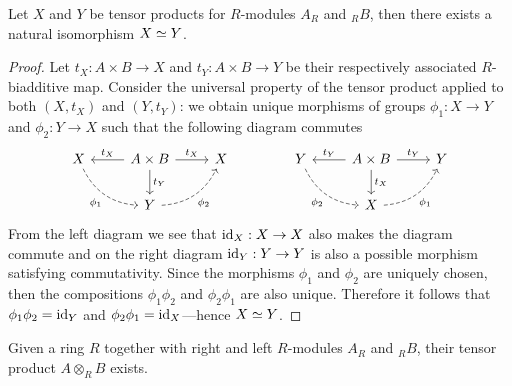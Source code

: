 \begin{lemma}
    \label{lem:tensor-product-unique-up-to-iso}
    Let \(X\) and \(Y\) be tensor products for \(R\)-modules \(A_R\) and \({}_RB\),
    then there exists a natural isomorphism \(X \simeq Y\).
\end{lemma}

\begin{proof}
    Let \(t_X: A \times B \to X\) and \(t_Y: A \times B \to Y\) be their
    respectively associated \(R\)-biadditive map. Consider the universal property of
    the tensor product applied to both \((X, t_X)\) and \((Y, t_Y)\): we obtain
    unique morphisms of groups \(\phi_1: X \to Y\) and \(\phi_2: Y \to X\) such that
    the following diagram commutes
    \[
        \begin{tikzcd}
            X \ar[rd, dashed, bend right, "\phi_1"']
            &A \times B \ar[l, "t_X"']
            \ar[d, "t_Y"]
            \ar[r, "t_X"]
            &X
            \\
            &Y \ar[ru, "\phi_2"', dashed, bend right] &
        \end{tikzcd}
        \qquad
        \qquad
        \begin{tikzcd}
            Y \ar[rd, dashed, bend right, "\phi_2"']
            &A \times B \ar[l, "t_Y"']
            \ar[d, "t_X"]
            \ar[r, "t_Y"]
            &Y
            \\
            &X \ar[ru, "\phi_1"', dashed, bend right] &
        \end{tikzcd}
    \]
    From the left diagram we see that \(\operatorname{id}_X: X \to X\) also makes the diagram
    commute and on the right diagram \(\operatorname{id}_Y: Y \to Y\) is also a possible morphism
    satisfying commutativity. Since the morphisms \(\phi_1\) and \(\phi_2\) are
    uniquely chosen, then the compositions \(\phi_1 \phi_2\) and \(\phi_2 \phi_1\)
    are also unique. Therefore it follows that \(\phi_1 \phi_2 = \operatorname{id}_Y\) and
    \(\phi_2 \phi_1 = \operatorname{id}_X\)---hence \(X \simeq Y\).
\end{proof}

\begin{lemma}[Existence]
    \label{lem:tensor-product-exists}
    Given a ring \(R\) together with right and left \(R\)-modules \(A_R\) and
    \({}_RB\), their tensor product \(A \otimes_R B\) exists.
\end{lemma}


